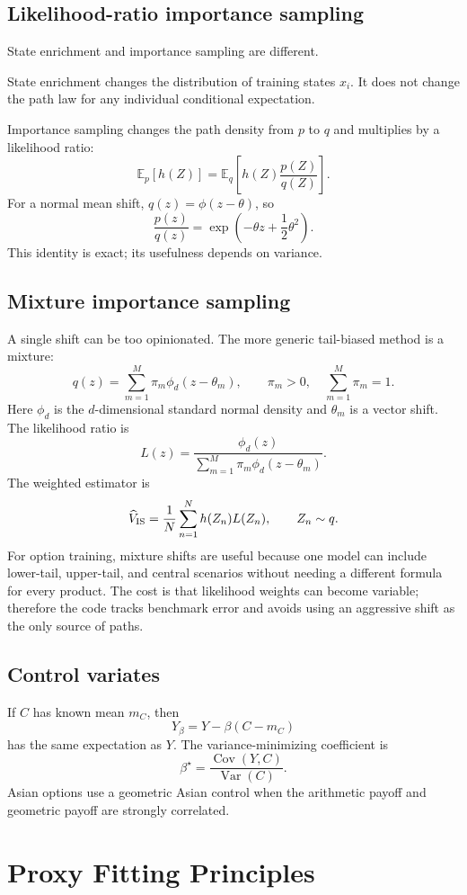 \documentclass[11pt,oneside]{book}
\theoremstyle{definition}
\newcommand{\E}{\mathbb{E}}
\newcommand{\Var}{\operatorname{Var}}
\newcommand{\Cov}{\operatorname{Cov}}
\begin{document}
\section{Likelihood-ratio importance sampling}
State enrichment and importance sampling are different.

State enrichment changes the distribution of training states \(x_i\). It does not change the path law for any individual conditional expectation.

Importance sampling changes the path density from \(p\) to \(q\) and multiplies by a likelihood ratio:
\[
  \E_p[h(Z)]
  =
  \E_q\!\left[h(Z)\frac{p(Z)}{q(Z)}\right].
\]
For a normal mean shift, \(q(z)=\phi(z-\theta)\), so
\[
  \frac{p(z)}{q(z)}
  =
  \exp\!\left(-\theta z+\frac12\theta^2\right).
\]
This identity is exact; its usefulness depends on variance.

\section{Mixture importance sampling}
A single shift can be too opinionated. The more generic tail-biased method is a mixture:
\[
  q(z)=\sum_{m=1}^M \pi_m \phi_d(z-\theta_m),
  \qquad
  \pi_m>0,\quad \sum_{m=1}^M\pi_m=1.
\]
Here \(\phi_d\) is the \(d\)-dimensional standard normal density and \(\theta_m\) is a vector shift. The likelihood ratio is
\[
  L(z)=\frac{\phi_d(z)}{\sum_{m=1}^M\pi_m\phi_d(z-\theta_m)}.
\]
The weighted estimator is
\[
  \widehat V_{\rm IS}
  =
  \frac1N\sum_{n=1}^N h(Z_n)L(Z_n),
  \qquad Z_n\sim q.
\]
For option training, mixture shifts are useful because one model can include lower-tail, upper-tail, and central scenarios without needing a different formula for every product. The cost is that likelihood weights can become variable; therefore the code tracks benchmark error and avoids using an aggressive shift as the only source of paths.

\section{Control variates}
If \(C\) has known mean \(m_C\), then
\[
  Y_\beta = Y-\beta(C-m_C)
\]
has the same expectation as \(Y\). The variance-minimizing coefficient is
\[
  \beta^\star=\frac{\Cov(Y,C)}{\Var(C)}.
\]
Asian options use a geometric Asian control when the arithmetic payoff and geometric payoff are strongly correlated.

\chapter{Proxy Fitting Principles}
\end{document}
